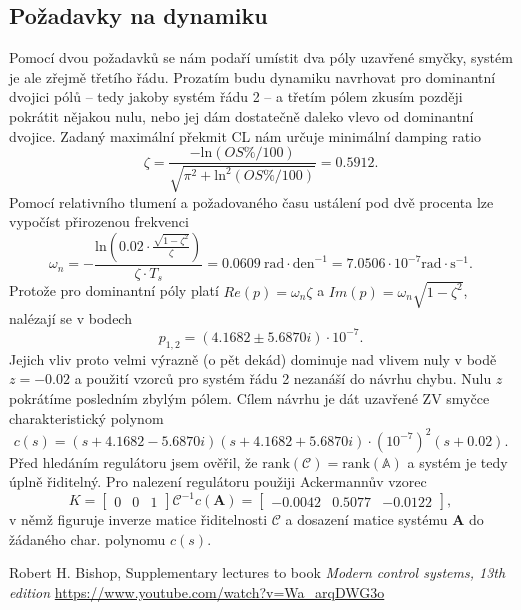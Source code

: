 \documentclass[twoside]{article}
\begin{document}
\subsection{Požadavky na dynamiku}
Pomocí dvou požadavků se nám podaří umístit dva póly uzavřené smyčky, systém je ale zřejmě třetího řádu. Prozatím budu dynamiku 
navrhovat pro dominantní dvojici pólů -- tedy jakoby systém řádu 2 -- a třetím pólem zkusím později pokrátit nějakou nulu, nebo jej 
dám dostatečně daleko vlevo od dominantní dvojice. Zadaný maximální překmit CL nám určuje minimální damping ratio
\begin{equation}
	\zeta = \frac{- \text{ln}(OS\%/100)}{\sqrt{\pi^2 + \text{ln}^2(OS\%/100)}} = 0.5912.
\end{equation}
Pomocí relativního tlumení a požadovaného času ustálení pod dvě procenta lze vypočíst přirozenou frekvenci
\begin{equation}
	\omega_n =  -\frac{\text{ln}(0.02 \cdot \frac{\sqrt{1-\zeta^2}}{\zeta})}{\zeta \cdot T_s} = 0.0609~\text{rad} \cdot \text{den}^{-1} = 7.0506 \cdot 10^{-7} \text{rad} \cdot \text{s}^{-1}.
\end{equation}
Protože pro dominantní póly platí $Re(p) = \omega_n \zeta$ a $Im(p) = \omega_n \sqrt{1-\zeta^2}$, nalézají se v bodech 
\begin{equation}
	p_{1,2} = (4.1682 \pm 5.6870i) \cdot 10^{-7}.
\end{equation}
Jejich vliv proto velmi výrazně (o pět dekád) dominuje nad vlivem nuly v bodě $z = -0.02$ a použití vzorců pro systém řádu 2 nezanáší do návrhu chybu.
Nulu $z$ pokrátíme posledním zbylým pólem. Cílem návrhu je dát uzavřené ZV smyčce charakteristický polynom
\begin{equation}
	c(s) = (s+4.1682 -5.6870i)(s + 4.1682 +5.6870i) \cdot \left(10^{-7}\right)^2 (s+0.02).
\end{equation}
Před hledáním regulátoru jsem ověřil, že $\text{rank}(\mathcal{C}) = \text{rank}(\mathbb{A})$ a systém je tedy úplně řiditelný.
Pro nalezení regulátoru použiji Ackermannův vzorec
\begin{equation}
	K = \begin{bmatrix}
		0 & 0 & 1
	\end{bmatrix} \mathcal{C}^{-1}  c(\mathbf{A}) = \begin{bmatrix}
		-0.0042 & 0.5077 & -0.0122
	\end{bmatrix},
\end{equation}
v němž figuruje inverze matice řiditelnosti $\mathcal{C}$ a dosazení matice systému $\mathbf{A}$ do žádaného char. polynomu $c(s)$.


\begin{thebibliography}{9}

	Robert H. Bishop, Supplementary lectures to book \emph{Modern control systems, 13th edition} 
		\url{https://www.youtube.com/watch?v=Wa_arqDWG3o}

\end{thebibliography}
\end{document}
